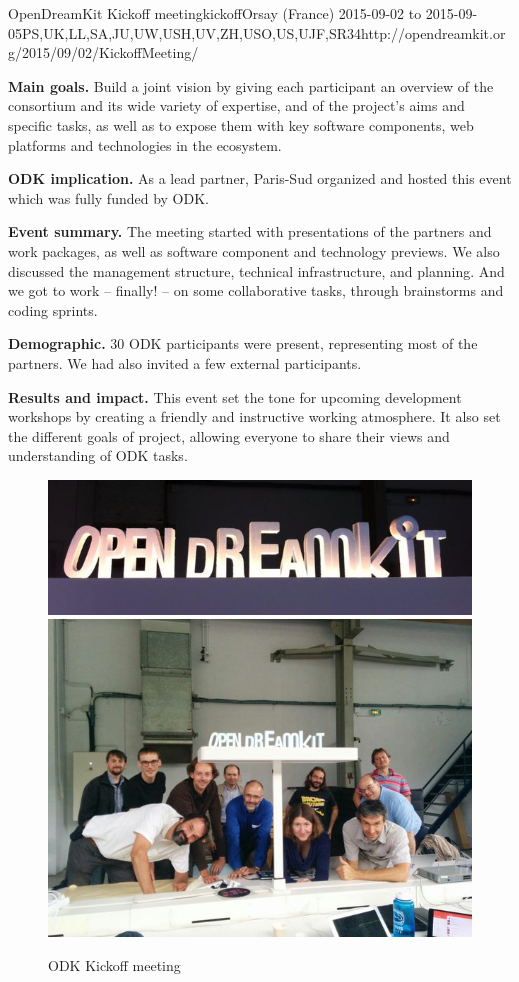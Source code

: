\begin{event}{OpenDreamKit Kickoff meeting}{kickoff}{Orsay (France) 2015-09-02 to 2015-09-05}{PS,UK,LL,SA,JU,UW,USH,UV,ZH,USO,US,UJF,SR}{34}{http://opendreamkit.org/2015/09/02/KickoffMeeting/}

  \textbf{Main goals.} Build a joint vision by giving each participant
  an overview of the consortium and its wide variety of expertise, and
  of the project’s aims and specific tasks, as well as to expose them
  with key software components, web platforms and technologies in the
  ecosystem.

  \textbf{ODK implication.} As a lead partner, Paris-Sud organized and
  hosted this event which was fully funded by ODK.

  \textbf{Event summary.} The meeting started with presentations of
  the partners and work packages, as well as software component and
  technology previews. We also discussed the management structure,
  technical infrastructure, and planning. And we got to work –
  finally!  – on some collaborative tasks, through brainstorms and
  coding sprints.

  \textbf{Demographic.} 30 ODK participants were present, representing
  most of the partners. We had also invited a few external
  participants.

  \textbf{Results and impact.} This event set the tone for upcoming
  development workshops by creating a friendly and instructive working
  atmosphere. It also set the different goals of project, allowing
  everyone to share their views and understanding of ODK tasks.

  \begin{figure}[ht]
    \caption*{ODK Kickoff meeting}
    \includegraphics[scale=0.3]{pictures/kickoff1.jpg}
    \includegraphics[scale=0.5]{pictures/kickoff2.jpg}
  \end{figure}
\end{event}
